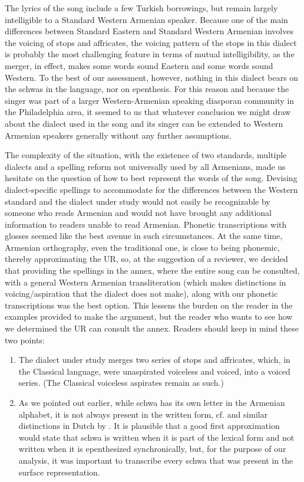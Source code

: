 \documentclass[output=paper,colorlinks,citecolor=brown]{langscibook}
\begin{document}
The lyrics of the song include a few Turkish borrowings, but remain largely intelligible to a Standard Western Armenian speaker.  Because one of the main differences between Standard Eastern and Standard Western Armenian involves the voicing of stops and affricates, the voicing pattern of the stops in this dialect is probably the most challenging feature in terms of mutual intelligibility, as the merger, in effect, makes some words sound Eastern and some words sound Western.  To the best of our assessment, however, nothing in this dialect bears on the schwas in the language, nor on epenthesis.  For this reason and because the singer was part of a larger Western-Armenian speaking diasporan community in the Philadelphia area, it seemed to us that whatever conclusion we might draw about the dialect used in the song and its singer can be extended to Western Armenian speakers generally without any further assumptions.

The complexity of the situation, with the existence of two standards, multiple dialects and a spelling reform not universally used by all Armenians, made us hesitate on the question of how to best represent the words of the song.  Devising dialect-specific spellings to accommodate for the differences between the Western standard and the dialect under study would not easily be recognizable by someone who reads Armenian and would not have brought any additional information to readers unable to read Armenian.  Phonetic transcriptions with glosses seemed like the best avenue in such circumstances.  At the same time, Armenian orthography, even the traditional one, is close to being phonemic, thereby approximating the UR, so, at the suggestion of a reviewer, we decided that providing the spellings in the annex, where the entire song can be consulted, with a general Western Armenian transliteration (which makes distinctions in voicing/aspiration that the dialect does not make), along with our phonetic transcriptions was the best option.  This lessens the burden on the reader in the examples provided to make the argument, but the reader who wants to see how we determined the UR can consult the annex.  Readers should keep in mind these two points:
 
\begin{enumerate}
    \item The dialect under study merges two series of stops and affricates, which, in the Classical language, were unaspirated voiceless and voiced, into a voiced series.  (The Classical voiceless aspirates remain as such.)
    \item As we pointed out earlier, while schwa has its own letter in the Armenian alphabet, it is not always present in the written form, cf. \citet{Baronian2017} and similar distinctions in Dutch by \citet{Oostendorp2011}.  It is plausible that a good first approximation would state that schwa is written when it is part of the lexical form and not written when it is epenthesized synchronically, but, for the purpose of our analysis, it was important to transcribe every schwa that was present in the surface representation.
\end{enumerate}
\end{document}
